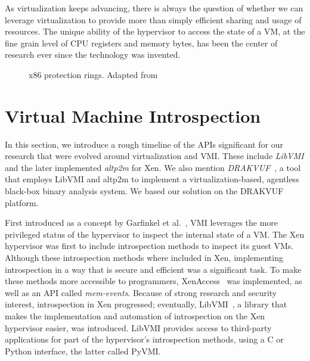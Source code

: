 As virtualization keeps advancing, there is always the question of whether we can leverage virtualization to provide more than simply efficient sharing and usage of resources. The unique ability of the hypervisor to access the state of a \ac{VM}, at the fine grain level of \ac{CPU} registers and memory bytes, has been the center of research ever since the technology was invented. 

\begin{figure}[ht]
	\centering
	
	\caption{x86 protection rings. Adapted from~\cite{rings}}
	\label{fig:rings}
\end{figure}

\section{Virtual Machine Introspection}\label{sec:vmi}
In this section, we introduce a rough timeline of the \acp{API} significant for our research that were evolved around virtualization and \ac{VMI}. These include \emph{LibVMI} and the later implemented \emph{altp2m} for Xen. We also mention \emph{DRAKVUF}~\cite{lengyel2014drakvuf}, a tool that employs LibVMI and altp2m to implement a virtualization-based, agentless black-box binary analysis system. We based our solution on the DRAKVUF platform. 	

\par First introduced as a concept by Garfinkel et al.~\cite{garfinkel2003virtual}, \ac{VMI} leverages the more privileged status of the hypervisor to inspect the internal state of a \ac{VM}. The Xen hypervisor was first to include introspection methods to inspect its guest \ac{VM}s. Although these introspection methods where included in Xen, implementing introspection in a way that is secure and efficient was a significant task. To make these methods more accessible to programmers, XenAccess~\cite{payne2007secure} was implemented, as well as an \ac{API} called \emph{mem-events}. Because of strong research and security interest, introspection in Xen progressed; eventually, LibVMI~\cite{payne2011libvmi}, a library that makes the implementation and automation of introspection on the Xen hypervisor easier, was introduced. LibVMI provides access to third-party applications for part of the hypervisor's introspection methods, using a C or Python interface, the latter called PyVMI. 


